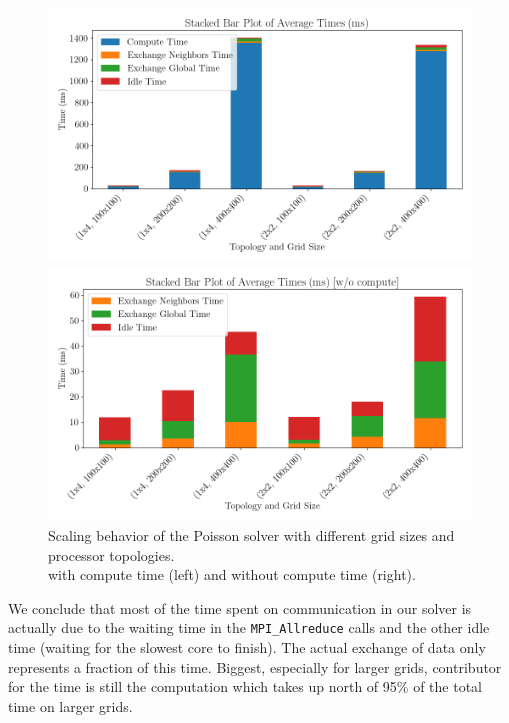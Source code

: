 \begin{figure}[H]
    \centering
    \begin{minipage}{0.48\textwidth}
        \centering
        \includegraphics[width=\linewidth]{../fig/lab2/average_times_stacked_bar_22.png}
    \end{minipage}%
    \hspace{0.02\textwidth}
    \begin{minipage}{0.48\textwidth}
        \centering
        \includegraphics[width=\linewidth]{../fig/lab2/average_times_stacked_bar_no_comp_22.png}
    \end{minipage}
    \caption{Scaling behavior of the Poisson solver with different grid sizes and processor topologies.\\
    with compute time (left) and without compute time (right).}
    \label{fig:timingbar}
\end{figure}
We conclude that most of the time spent on communication in our solver is actually due to the waiting time in the \texttt{MPI\_Allreduce} calls and the other idle time (waiting for the slowest core to finish). The actual exchange of data only represents a fraction of this time. Biggest, especially for larger grids, contributor for the time is still the computation which takes up north of 95\% of the total time on larger grids.\\
